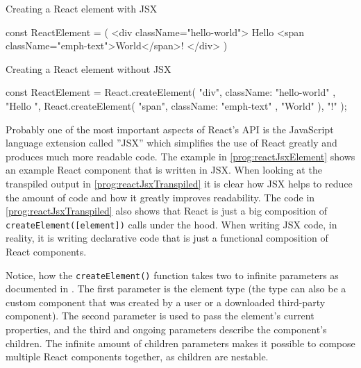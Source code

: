 \begin{program}
\caption{Creating a React element with JSX} 
\label{prog:reactJsxElement}
\begin{JsCode}
const ReactElement = (
  <div className="hello-world">
    Hello <span className="emph-text">World</span>!
  </div>
)
\end{JsCode}
\end{program}

\begin{program}
\caption{Creating a React element without JSX} 
\label{prog:reactJsxTranspiled}
\begin{JsCode}
const ReactElement = React.createElement(
  "div", 
  { className: "hello-world" }, 
  "Hello ", 
  React.createElement(
    "span", 
    { className: "emph-text" }, 
    "World"
  ), 
  "!"
);
\end{JsCode}
\end{program}

Probably one of the most important aspects of React's API is the JavaScript language extension called ''JSX'' which simplifies the use of React greatly and produces much more readable code. The example in \ref{prog:reactJsxElement} shows an example React component that is written in JSX. When looking at the transpiled output in \ref{prog:reactJsxTranspiled} it is clear how JSX helps to reduce the amount of code and how it greatly improves readability. The code in \ref{prog:reactJsxTranspiled} also shows that React is just a big composition of \texttt{createElement([element])} calls under the hood. When writing JSX code, in reality, it is writing declarative code that is just a functional composition of React components. 

Notice, how the \texttt{createElement()} function takes two to infinite parameters as documented in \cite[/docs/react-api.html]{React}. The first parameter is the element type (the type can also be a custom component that was created by a user or a downloaded third-party component). The second parameter is used to pass the element's current properties, and the third and ongoing parameters describe the component's children. The infinite amount of children parameters makes it possible to compose multiple React components together, as children are nestable. 

